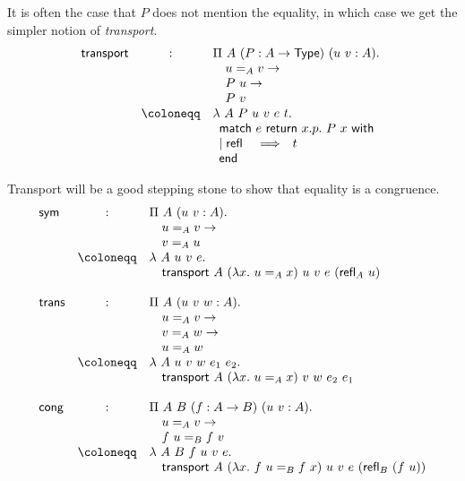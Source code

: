 It is often the case that \(P\) does not mention the equality, in which case we
get the simpler notion of \emph{transport}.
\[
  \begin{array}{lcl}
    \ntransp &:&
    \Pi\ A\ (P : A \to \Type)\ (u\ v : A).\ \\
    && \quad u =_A v \to \\
    && \quad P\ u \to \\
    && \quad P\ v \\
    &\coloneqq& \lambda\ A\ P\ u\ v\ e\ t.\ \\
    && \pmatch{e}{x.p.\ P\ x}{
          \branch{\refl{}}{t}
        }
  \end{array}
\]

Transport will be a good stepping stone to show that equality is a congruence.
\[
  \begin{array}{lcl}
    \mathsf{sym} &:&
    \Pi\ A\ (u\ v : A).\ \\
    && \quad u =_A v \to \\
    && \quad v =_A u \\
    &\coloneqq& \lambda\ A\ u\ v\ e.\ \\
    && \quad \ntransp\ A\ (\lambda x.\ u =_A x)\ u\ v\ e\ (\refl{A} u) \\
    \\
    \mathsf{trans} &:&
    \Pi\ A\ (u\ v\ w : A).\ \\
    && \quad u =_A v \to \\
    && \quad v =_A w \to \\
    && \quad u =_A w \\
    &\coloneqq& \lambda\ A\ u\ v\ w\ e_1\ e_2.\ \\
    && \quad \ntransp\ A\ (\lambda x.\ u =_A x)\ v\ w\ e_2\ e_1 \\
    \\
    \mathsf{cong} &:&
    \Pi\ A\ B\ (f : A \to B)\ (u\ v : A).\ \\
    && \quad u =_A v \to \\
    && \quad f\ u =_B f\ v \\
    &\coloneqq& \lambda\ A\ B\ f\ u\ v\ e.\ \\
    && \quad \ntransp\ A\ (\lambda x.\ f\ u =_B f\ x)\ u\ v\ e\
    (\refl{B} (f\ u))
  \end{array}
\]

